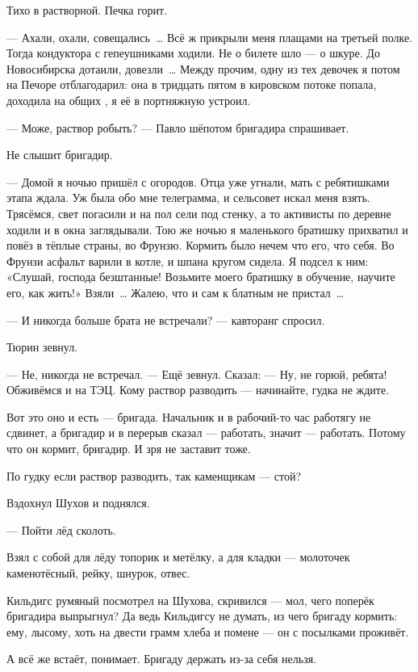 Тихо в растворной. Печка горит.

--- Ахали, охали, совещались~\dots{} Всё ж прикрыли меня плащами на третьей полке. Тогда 
кондуктора с гепеушниками ходили. Не о билете шло --- о шкуре. До Новосибирска дотаили, 
довезли~\dots{} Между прочим, одну из тех девочек я потом на Печоре отблагодарил: она в тридцать 
пятом в кировском потоке попала, доходила на общих , я её в портняжную устроил.

--- Може, раствор робыть? --- Павло шёпотом бригадира спрашивает.

Не слышит бригадир.

--- Домой я ночью пришёл с огородов. Отца уже угнали, мать с ребятишками этапа ждала. Уж была 
обо мне телеграмма, и сельсовет искал меня взять. Трясёмся, свет погасили и на пол сели под 
стенку, а то активисты по деревне ходили и в окна заглядывали. Тою же ночью я маленького 
братишку прихватил и повёз в тёплые страны, во Фрунзю. Кормить было нечем что его, что себя. 
Во Фрунзи асфальт варили в котле, и шпана кругом сидела. Я подсел к ним: «Слушай, господа 
безштанные! Возьмите моего братишку в обучение, научите его, как жить!» Взяли~\dots{} Жалею, что 
и сам к блатным не пристал~\dots{}

--- И никогда больше брата не встречали? --- кавторанг спросил.

Тюрин зевнул.

--- Не, никогда не встречал. --- Ещё зевнул. Сказал: --- Ну, не горюй, ребята! Обживёмся и на ТЭЦ. 
Кому раствор разводить --- начинайте, гудка не ждите.

Вот это оно и есть --- бригада. Начальник и в рабочий-то час работягу не сдвинет, а бригадир и в 
перерыв сказал --- работать, значит --- работать. Потому что он кормит, бригадир. И зря не 
заставит тоже.

По гудку если раствор разводить, так каменщикам --- стой?

Вздохнул Шухов и поднялся.

--- Пойти лёд сколоть.

Взял с собой для лёду топорик и метёлку, а для кладки --- молоточек каменотёсный, рейку, 
шнурок, отвес.

Кильдигс румяный посмотрел на Шухова, скривился --- мол, чего поперёк бригадира выпрыгнул? Да 
ведь Кильдигсу не думать, из чего бригаду кормить: ему, лысому, хоть на двести грамм хлеба и 
помене --- он с посылками проживёт.

А всё же встаёт, понимает. Бригаду держать из-за себя нельзя.

